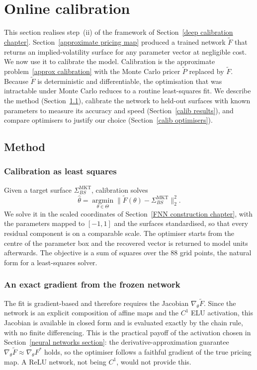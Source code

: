 \documentclass[12pt,a4paper]{article}
\theoremstyle{remark} \newtheorem{remark}[theorem]{Remark}
\begin{document}
\section{Online calibration}\label{calibration chapter}
This section realises step~(ii) of the framework of Section~\ref{deep calibration chapter}. Section~\ref{approximate pricing map} produced a trained network $\widetilde F$ that returns an implied-volatility surface for any parameter vector at negligible cost. We now use it to calibrate the model. Calibration is the approximate problem~\eqref{approx calibration} with the Monte Carlo pricer $\widetilde P$ replaced by $\widetilde F$. Because $\widetilde F$ is deterministic and differentiable, the optimisation that was intractable under Monte Carlo reduces to a routine least-squares fit. We describe the method (Section~\ref{calib method}), calibrate the network to held-out surfaces with known parameters to measure its accuracy and speed (Section~\ref{calib results}), and compare optimisers to justify our choice (Section~\ref{calib optimisers}).

\subsection{Method}\label{calib method}
\subsubsection{Calibration as least squares}
Given a target surface $\Sigma^{\mathrm{MKT}}_{BS}$, calibration solves
\[
\hat\theta=\operatorname*{argmin}_{\theta\in\Theta}\big\lVert\widetilde F(\theta)-\Sigma^{\mathrm{MKT}}_{BS}\big\rVert_2^2.
\]
We solve it in the scaled coordinates of Section~\ref{FNN construction chapter}, with the parameters mapped to $[-1,1]$ and the surfaces standardised, so that every residual component is on a comparable scale. The optimiser starts from the centre of the parameter box and the recovered vector is returned to model units afterwards. The objective is a sum of squares over the $88$ grid points, the natural form for a least-squares solver.

\subsubsection{An exact gradient from the frozen network}
The fit is gradient-based and therefore requires the Jacobian $\nabla_\theta\widetilde F$. Since the network is an explicit composition of affine maps and the $C^1$ ELU activation, this Jacobian is available in closed form and is evaluated exactly by the chain rule, with no finite differencing. This is the practical payoff of the activation chosen in Section~\ref{neural networks section}: the derivative-approximation guarantee $\nabla_\theta\widetilde F\approx\nabla_\theta F^*$ holds, so the optimiser follows a faithful gradient of the true pricing map. A ReLU network, not being $C^1$, would not provide this.
\end{document}

